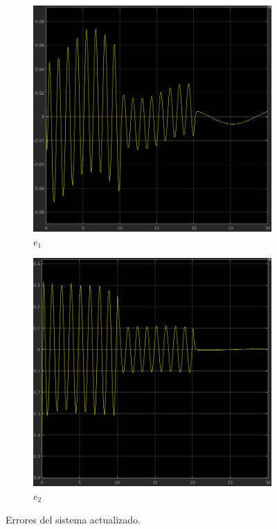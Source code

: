 \documentclass[12pt, letterpaper]{article}
\begin{document}
\begin{figure}[H]
	\centering
	\begin{subfigure}[b]{0.49\linewidth}
		\includegraphics[width=\linewidth]{e1.png}
		\caption{$e_1$}
	\end{subfigure}
	\begin{subfigure}[b]{0.49\linewidth}
		\includegraphics[width=\linewidth]{e2.png}
		\caption{$e_2$}
	\end{subfigure}
	\caption{Errores del sistema actualizado.}
\end{figure}
\end{document}
